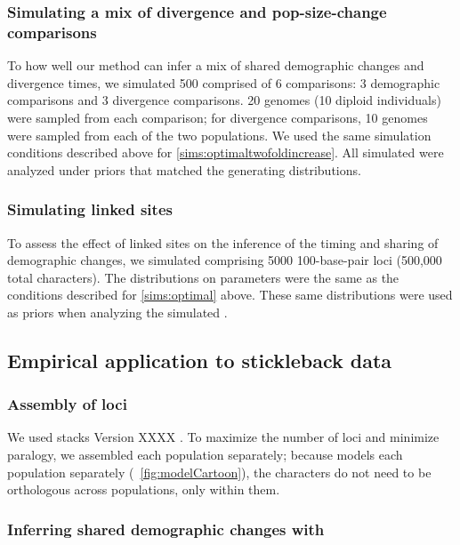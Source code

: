 \subsubsection{Simulating a mix of divergence and pop-size-change comparisons}

To how well our method can infer a mix of shared demographic changes and
divergence times, we simulated 500 \datasets comprised of 6 comparisons:
3 demographic comparisons and
3 divergence comparisons.
20 genomes (10 diploid individuals) were sampled from each comparison; for
divergence comparisons, 10 genomes were sampled from each of the two
populations.
We used the same simulation conditions described above for
\ref{sims:optimaltwofoldincrease}.
All simulated \datasets were analyzed under priors that matched
the generating distributions.


\subsubsection{Simulating linked sites}
To assess the effect of linked sites on the inference
of the timing and sharing of demographic changes,
we simulated \datasets comprising 5000 100-base-pair
loci (500,000 total characters).
The distributions on parameters were the same
as the conditions described for \ref{sims:optimal} above.
These same distributions were used as priors when
analyzing the simulated \datasets.


\subsection{Empirical application to stickleback data}

\subsubsection{Assembly of loci}
We used stacks Version XXXX \citationNeeded.
To maximize the number of loci and minimize paralogy, we assembled each
population separately;
because \ecoevolity models each population separately
(\fig{}~\ref{fig:modelCartoon}),
the characters do not need to be orthologous across populations, only within
them.

\subsubsection{Inferring shared demographic changes with \ecoevolity}


